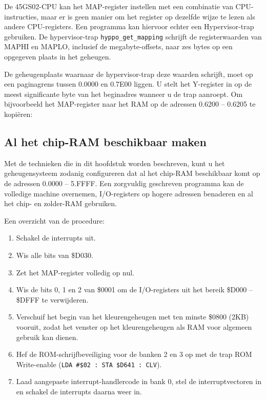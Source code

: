 De 45GS02-CPU kan het MAP-register instellen met een combinatie van CPU-instructies, maar er is geen manier om het register op dezelfde wijze te lezen als andere CPU-registers. Een programma kan hiervoor echter een Hypervisor-trap gebruiken. De hypervisor-trap {\tt hyppo\_get\_mapping} schrijft de registerwaarden van MAPHI en MAPLO, inclusief de megabyte-offsets, naar zes bytes op een opgegeven plaats in het geheugen.

De geheugenplaats waarnaar de hypervisor-trap deze waarden schrijft, moet op een paginagrens tussen 0.0000 en 0.7E00 liggen. U stelt het Y-register in op de meest significante byte van het beginadres wanneer u de trap aanroept. Om bijvoorbeeld het MAP-register naar het RAM op de adressen 0.6200 -- 0.6205 te kopiëren:


\subsection{Al het chip-RAM beschikbaar maken}

Met de technieken die in dit hoofdstuk worden beschreven, kunt u het geheugensysteem zodanig configureren dat al het chip-RAM beschikbaar komt op de adressen 0.0000 -- 5.FFFF. Een zorgvuldig geschreven programma kan de volledige machine overnemen, I/O-registers op hogere adressen benaderen en al het chip- en zolder-RAM gebruiken.

Een overzicht van de procedure:

\begin{enumerate}
\item Schakel de interrupts uit.\item Wis alle bits van \$D030.\item Zet het MAP-register volledig op nul.\item Wis de bits 0, 1 en 2 van \$0001 om de I/O-registers uit het bereik \$D000 -- \$DFFF te verwijderen.\item Verschuif het begin van het kleurengeheugen met ten minste \$0800 (2KB) vooruit, zodat het venster op het kleurengeheugen als RAM voor algemeen gebruik kan dienen.\item Hef de ROM-schrijfbeveiliging voor de banken 2 en 3 op met de trap ROM Write-enable ({\tt LDA \#\$02 : STA \$D641 : CLV}).\item Laad aangepaste interrupt-handlercode in bank 0, stel de interruptvectoren in en schakel de interrupts daarna weer in.
\end{enumerate}

